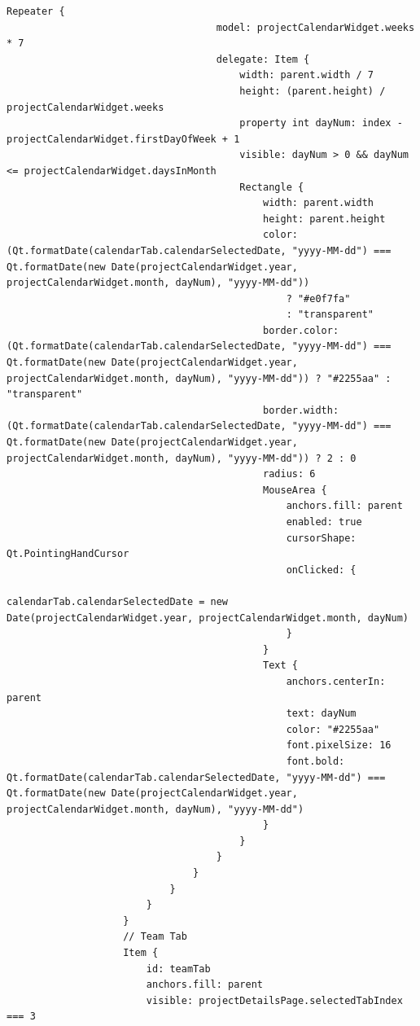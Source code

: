 \documentclass{report}
\begin{document}
\begin{lstlisting}[style=qmlstyle]
                                Repeater {
                                    model: projectCalendarWidget.weeks * 7
                                    delegate: Item {
                                        width: parent.width / 7
                                        height: (parent.height) / projectCalendarWidget.weeks
                                        property int dayNum: index - projectCalendarWidget.firstDayOfWeek + 1
                                        visible: dayNum > 0 && dayNum <= projectCalendarWidget.daysInMonth
                                        Rectangle {
                                            width: parent.width
                                            height: parent.height
                                            color: (Qt.formatDate(calendarTab.calendarSelectedDate, "yyyy-MM-dd") === Qt.formatDate(new Date(projectCalendarWidget.year, projectCalendarWidget.month, dayNum), "yyyy-MM-dd"))
                                                ? "#e0f7fa"
                                                : "transparent"
                                            border.color: (Qt.formatDate(calendarTab.calendarSelectedDate, "yyyy-MM-dd") === Qt.formatDate(new Date(projectCalendarWidget.year, projectCalendarWidget.month, dayNum), "yyyy-MM-dd")) ? "#2255aa" : "transparent"
                                            border.width: (Qt.formatDate(calendarTab.calendarSelectedDate, "yyyy-MM-dd") === Qt.formatDate(new Date(projectCalendarWidget.year, projectCalendarWidget.month, dayNum), "yyyy-MM-dd")) ? 2 : 0
                                            radius: 6
                                            MouseArea {
                                                anchors.fill: parent
                                                enabled: true
                                                cursorShape: Qt.PointingHandCursor
                                                onClicked: {
                                                    calendarTab.calendarSelectedDate = new Date(projectCalendarWidget.year, projectCalendarWidget.month, dayNum)
                                                }
                                            }
                                            Text {
                                                anchors.centerIn: parent
                                                text: dayNum
                                                color: "#2255aa"
                                                font.pixelSize: 16
                                                font.bold: Qt.formatDate(calendarTab.calendarSelectedDate, "yyyy-MM-dd") === Qt.formatDate(new Date(projectCalendarWidget.year, projectCalendarWidget.month, dayNum), "yyyy-MM-dd")
                                            }
                                        }
                                    }
                                }
                            }
                        }
                    }
                    // Team Tab
                    Item {
                        id: teamTab
                        anchors.fill: parent
                        visible: projectDetailsPage.selectedTabIndex === 3


\end{lstlisting}
\end{document}
